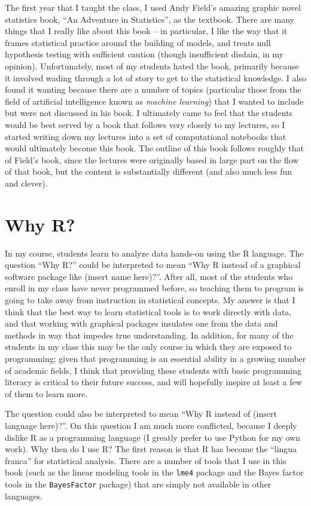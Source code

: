\documentclass[12pt,]{book}
\begin{document}
The first year that I taught the class, I used Andy Field's amazing graphic novel statistics book, ``An Adventure in Statistics'', as the textbook. There are many things that I really like about this book -- in particular, I like the way that it frames statistical practice around the building of models, and treats null hypothesis testing with sufficient caution (though insufficient disdain, in my opinion). Unfortunately, most of my students hated the book, primarily because it involved wading through a lot of story to get to the statistical knowledge. I also found it wanting because there are a number of topics (particular those from the field of artificial intelligence known as \emph{machine learning}) that I wanted to include but were not discussed in his book. I ultimately came to feel that the students would be best served by a book that follows very closely to my lectures, so I started writing down my lectures into a set of computational notebooks that would ultimately become this book. The outline of this book follows roughly that of Field's book, since the lectures were originally based in large part on the flow of that book, but the content is substantially different (and also much less fun and clever).

\hypertarget{why-r}{%
\section{Why R?}\label{why-r}}

In my course, students learn to analyze data hands-on using the R language. The question ``Why R?'' could be interpreted to mean ``Why R instead of a graphical software package like (insert name here)?''. After all, most of the students who enroll in my class have never programmed before, so teaching them to program is going to take away from instruction in statistical concepts. My answer is that I think that the best way to learn statistical tools is to work directly with data, and that working with graphical packages insulates one from the data and methods in way that impedes true understanding. In addition, for many of the students in my class this may be the only course in which they are exposed to programming; given that programming is an essential ability in a growing number of academic fields, I think that providing these students with basic programming literacy is critical to their future success, and will hopefully inspire at least a few of them to learn more.

The question could also be interpreted to mean ``Why R instead of (insert language here)?''. On this question I am much more conflicted, because I deeply dislike R as a programming language (I greatly prefer to use Python for my own work). Why then do I use R? The first reason is that R has become the ``lingua franca'' for statistical analysis. There are a number of tools that I use in this book (such as the linear modeling tools in the \texttt{lme4} package and the Bayes factor tools in the \texttt{BayesFactor} package) that are simply not available in other languages.
\end{document}
